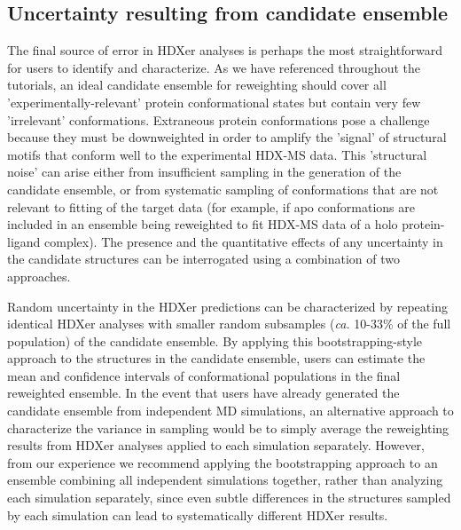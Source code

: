 \documentclass[9pt,tutorial]{livecoms}
\begin{document}
\subsection{Uncertainty resulting from candidate ensemble}\label{ensemble_uncertainty_sect}
The final source of error in HDXer analyses is perhaps the most straightforward for users to identify and characterize.
As we have referenced throughout the tutorials, an ideal candidate ensemble for reweighting should cover all 'experimentally-relevant' protein conformational states but contain very few 'irrelevant' conformations.
Extraneous protein conformations pose a challenge because they must be downweighted in order to amplify the 'signal' of structural motifs that conform well to the experimental HDX-MS data.
This 'structural noise' can arise either from insufficient sampling in the generation of the candidate ensemble, or from systematic sampling of conformations that are not relevant to fitting of the target data (for example, if apo conformations are included in an ensemble being reweighted to fit HDX-MS data of a holo protein-ligand complex).
The presence and the quantitative effects of any uncertainty in the candidate structures can be interrogated using a combination of two approaches.

Random uncertainty in the HDXer predictions can be characterized by repeating identical HDXer analyses with smaller random subsamples (\textit{ca.} 10-33\% of the full population) of the candidate ensemble.
By applying this bootstrapping-style approach to the structures in the candidate ensemble, users can estimate the mean and confidence intervals of conformational populations in the final reweighted ensemble.
In the event that users have already generated the candidate ensemble from independent MD simulations, an alternative approach to characterize the variance in sampling would be to simply average the reweighting results from HDXer analyses applied to each simulation separately.
However, from our experience we recommend applying the bootstrapping approach to an ensemble combining all independent simulations together, rather than analyzing each simulation separately, since even subtle differences in the structures sampled by each simulation can lead to systematically different HDXer results.
\end{document}
